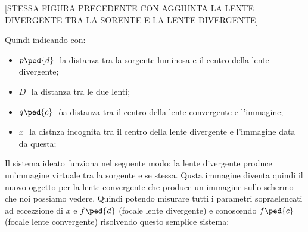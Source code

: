 [STESSA FIGURA PRECEDENTE CON AGGIUNTA LA LENTE DIVERGENTE TRA LA SORENTE E LA LENTE DIVERGENTE]

Quindi indicando con:
\begin{itemize}
	\item{$p\ped{d}\,\,$ la distanza tra la sorgente luminosa e il centro della lente divergente;}
	\item{$D\,\,$ la distanza tra le due lenti;}
	\item{$q\ped{c}\,\,$ òa distanza tra il centro della lente convergente e l'immagine;}
	\item{$x\,\,$ la distnza incognita tra il centro della lente divergente e l'immagine data da questa;}
\end{itemize}
Il sistema ideato funziona nel seguente modo: la lente divergente produce un'mmagine virtuale tra la sorgente e se stessa. Qusta immagine diventa quindi il nuovo oggetto per la lente convergente che produce un immagine sullo schermo che noi possiamo vedere. Quindi potendo misurare tutti i parametri sopraelencati ad eccezzione di $x$ e $f\ped{d}$ (focale lente divergente) e conoscendo $f\ped{c}$ (focale lente convergente) risolvendo questo semplice sistema:


